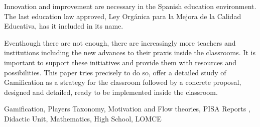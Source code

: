 

Innovation and improvement are necessary in the Spanish education environment.
%
The last education law approved, Ley Orgánica para la Mejora de la Calidad Educativa, has it included in its name.

Eventhough there are not enough, there are increasingly more teachers and institutions including the new advances to their praxis inside the classrooms.
%
It is important to support these initiatives and provide them with resources and possibilities.  
%
This paper tries precisely to do so, offer a detailed study of Gamification as a strategy for the classroom followed by a concrete proposal, designed and detailed, ready to be implemented inside the classroom.


\begin{keywordsEn}
Gamification, Players Taxonomy, Motivation and Flow theories, PISA Reports , Didactic Unit, Mathematics, High School, LOMCE
\end{keywordsEn}

